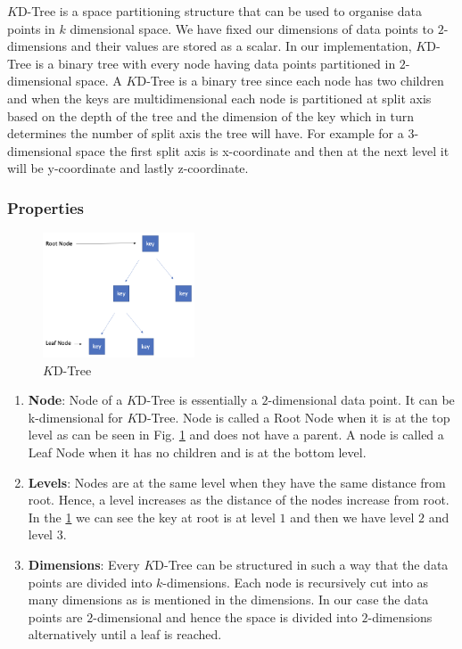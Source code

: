 $K$D-Tree is a space partitioning structure that can be used to organise data points in $k$ dimensional space. We have fixed our dimensions of data points to $2$-dimensions and their values are stored as a scalar. In our implementation, $K$D-Tree is a binary tree with every node having data points partitioned in $2$-dimensional space. A $K$D-Tree is a binary tree since each node has two children and when the keys are multidimensional each node is partitioned at split axis based on the depth of the tree and the dimension of the key which in turn determines the number of split axis the tree will have. For example for a $3$-dimensional space the first split axis is x-coordinate and then at the next level it will be y-coordinate and lastly z-coordinate.

\subsubsection{Properties}

\begin{figure}[htp]
    \centering
    \includegraphics[width=0.4\textwidth]{graphs/KD-Tree.png}
    \caption{$K$D-Tree}
    \label{fig:$K$D-Tree}
\end{figure}

\begin{enumerate}
    \item\textbf{Node}: Node of a $K$D-Tree is essentially a $2$-dimensional data point. It can be k-dimensional for $K$D-Tree. Node is called a Root Node when it is at the top level as can be seen in Fig. \ref{fig:$K$D-Tree} and does not have a parent. A node is called a Leaf Node when it has no children and is at the bottom level. 

    \item\textbf{Levels}: Nodes are at the same level when they have the same distance from root. Hence, a level increases as the distance of the nodes increase from root. In the \ref{fig:$K$D-Tree} we can see the key at root is at level $1$ and then we have level $2$ and level $3$. 
    \item\textbf{Dimensions}: Every $K$D-Tree can be structured in such a way that the data points are divided into $k$-dimensions. Each node is recursively cut into as many dimensions as is mentioned in the dimensions. In our case the data points are $2$-dimensional and hence the space is divided into $2$-dimensions alternatively until a leaf is reached.
\end{enumerate}
    
